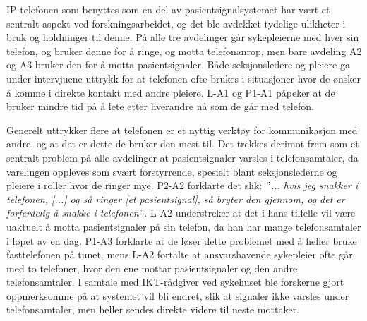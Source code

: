 \noindent
IP-telefonen som benyttes som en del av pasientsignalsystemet har vært et sentralt aspekt ved forskningsarbeidet, og det ble avdekket tydelige ulikheter i bruk og holdninger til denne. På alle tre avdelinger går sykepleierne med hver sin telefon, og bruker denne for å ringe, og motta telefonanrop, men bare avdeling A2 og A3 bruker den for å motta pasientsignaler. Både seksjonsledere og pleiere ga under intervjuene uttrykk for at telefonen ofte brukes i situasjoner hvor de ønsker å komme i direkte kontakt med andre pleiere. L-A1 og P1-A1 påpeker at de bruker mindre tid på å lete etter hverandre nå som de går med telefon.   

\noindent
Generelt uttrykker flere at telefonen er et nyttig verktøy for kommunikasjon med andre, og at det er dette de bruker den mest til. Det trekkes derimot frem som et sentralt problem på alle avdelinger at pasientsignaler varsles i telefonsamtaler, da varslingen oppleves som svært forstyrrende, spesielt blant seksjonslederne og pleiere i roller hvor de ringer mye. P2-A2 forklarte det slik: \textit{ $"$... hvis jeg snakker i telefonen, [...] og så ringer [et pasientsignal], så bryter den gjennom, og det er forferdelig å snakke i telefonen$"$}. L-A2 understreker at det i hans tilfelle vil være uaktuelt å motta pasientsignaler på sin telefon, da han har mange telefonsamtaler i løpet av en dag. P1-A3 forklarte at de løser dette problemet med å heller bruke fasttelefonen på tunet, mens L-A2 fortalte at ansvarshavende sykepleier ofte går med to telefoner, hvor den ene mottar pasientsignaler og den andre telefonsamtaler. I samtale med IKT-rådgiver ved sykehuset ble forskerne gjort oppmerksomme på at systemet vil bli endret, slik at signaler ikke varsles under telefonsamtaler, men heller sendes direkte videre til neste mottaker.

